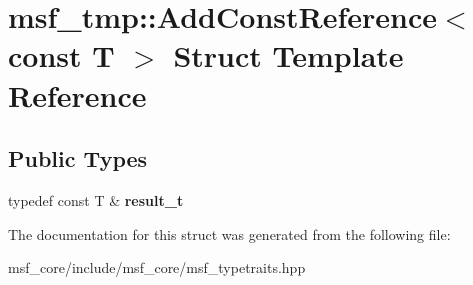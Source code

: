 \hypertarget{structmsf__tmp_1_1AddConstReference_3_01const_01T_01_4}{\section{msf\-\_\-tmp\-:\-:Add\-Const\-Reference$<$ const T $>$ Struct Template Reference}
\label{structmsf__tmp_1_1AddConstReference_3_01const_01T_01_4}
}
\subsection*{Public Types}
\begin{DoxyCompactItemize}
\item 
\hypertarget{structmsf__tmp_1_1AddConstReference_3_01const_01T_01_4_adf325d18e253a3f5625ba8456ce75652}{typedef const T \& {\bfseries result\-\_\-t}}\label{structmsf__tmp_1_1AddConstReference_3_01const_01T_01_4_adf325d18e253a3f5625ba8456ce75652}

\end{DoxyCompactItemize}


The documentation for this struct was generated from the following file\-:\begin{DoxyCompactItemize}
\item 
msf\-\_\-core/include/msf\-\_\-core/msf\-\_\-typetraits.\-hpp\end{DoxyCompactItemize}
